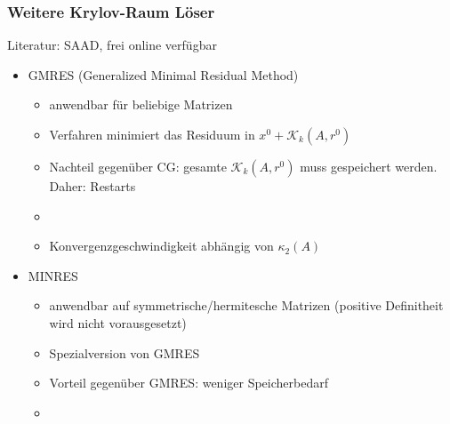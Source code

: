 \subsubsection{Weitere Krylov-Raum Löser}
Literatur: SAAD, frei online verfügbar
\begin{itemize}
  \item GMRES (Generalized Minimal Residual Method)
    \begin{itemize}
      \item anwendbar für beliebige Matrizen
      \item Verfahren minimiert das Residuum in $x^0 + \mathcal{K}_k(A,r^0)$
      \item Nachteil gegenüber CG: gesamte $\mathcal{K}_k(A,r^0)$ muss gespeichert werden. Daher: Restarts
      \item {}
      \item Konvergenzgeschwindigkeit abhängig von $\kappa_2(A)$
    \end{itemize}
  \item MINRES
    \begin{itemize}
      \item anwendbar auf symmetrische/hermitesche Matrizen (positive Definitheit wird nicht vorausgesetzt)
      \item Spezialversion von GMRES
      \item Vorteil gegenüber GMRES: weniger Speicherbedarf
      \item {}
    \end{itemize}
\end{itemize}
